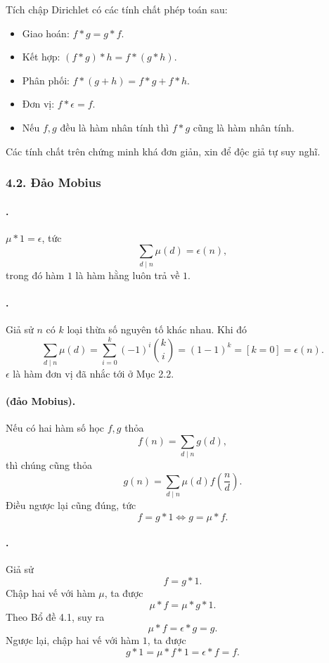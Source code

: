 \documentclass[11pt]{article}
\begin{document}
Tích chập Dirichlet có các tính chất phép toán sau:
\begin{itemize}
  \item Giao hoán: \(f*g=g*f\).
  \item Kết hợp: \((f*g)*h=f*(g*h)\).
  \item Phân phối: \(f*(g+h)=f*g+f*h\).
  \item Đơn vị: \(f*\epsilon=f\).
  \item Nếu \(f,g\) đều là hàm nhân tính thì \(f*g\) cũng là hàm nhân tính.
\end{itemize}

Các tính chất trên chứng minh khá đơn giản, xin để độc giả tự suy nghĩ.

\subsubsection*{4.2. Đảo Mobius}

\paragraph{.}
\(\mu*1=\epsilon\), tức
\[
  \sum_{d\mid n}\mu(d)=\epsilon(n),
\]
trong đó hàm \(1\) là hàm hằng luôn trả về \(1\).

\paragraph{.}
Giả sử \(n\) có \(k\) loại thừa số nguyên tố khác nhau. Khi đó
\[
  \sum_{d\mid n}\mu(d)
  = \sum_{i=0}^{k}(-1)^i\binom{k}{i}
  = (1-1)^k
  = [k=0]
  = \epsilon(n).
\]
\(\epsilon\) là hàm đơn vị đã nhắc tới ở Mục 2.2.

\paragraph{ (đảo Mobius).}
Nếu có hai hàm số học \(f,g\) thỏa
\[
  f(n)=\sum_{d\mid n}g(d),
\]
thì chúng cũng thỏa
\[
  g(n)=\sum_{d\mid n}\mu(d)f\left(\frac{n}{d}\right).
\]
Điều ngược lại cũng đúng, tức
\[
  f=g*1 \Longleftrightarrow g=\mu*f.
\]

\paragraph{.}
Giả sử
\[
  f=g*1.
\]
Chập hai vế với hàm \(\mu\), ta được
\[
  \mu*f=\mu*g*1.
\]
Theo Bổ đề 4.1, suy ra
\[
  \mu*f=\epsilon*g=g.
\]
Ngược lại, chập hai vế với hàm \(1\), ta được
\[
  g*1=\mu*f*1=\epsilon*f=f.
\]
\end{document}
